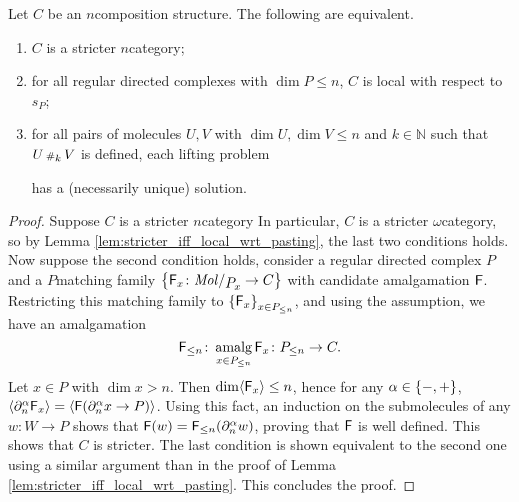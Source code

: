 \begin{lem} \label{lem:stricter_n_iff_local_with_dim_le_n}
    Let \( C \) be an \( n \)\nbd composition structure.
    The following are equivalent.
    \begin{enumerate}
        \item \( C \) is a stricter \( n \)\nbd category;
        \item for all regular directed complexes with \( \dim P \le n \), \( C \) is local with respect to \( s_P \);
        \item for all pairs of molecules \( U, V \) with \( \dim U, \dim V \le n \) and \( k \in \mathbb{N} \) such that \( U \cp{k} V \) is defined, each lifting problem
            \begin{center}
            \end{center}
            has a (necessarily unique) solution.
    \end{enumerate}
\end{lem}
\begin{proof}
    Suppose \( C \) is a stricter \( n \)\nbd category 
    In particular, \( C \) is a stricter \( \omega \)\nbd category, so by Lemma \ref{lem:stricter_iff_local_wrt_pasting}, the last two conditions holds.
    Now suppose the second condition holds, consider a regular directed complex \( P \) and a \( P \)\nbd matching family \( \set{\F_x \colon \molecin{\imel{P}{x}} \to C} \) with candidate amalgamation \( \F \).
    Restricting this matching family to \( \set{\F_x}_{x \in \gr{\le n}{P}} \), and using the assumption, we have an amalgamation 
    \begin{equation*}
        \gr{\le n}{\F} \colon \amalg_{x \in \gr{\le n}{P}} \F_x \colon \gr{\le n}{P} \to C.
    \end{equation*}
    Let \( x \in P \) with \( \dim x > n \).
    Then \( \dim \pcell{\F_x} \le n \), hence for any \( \a \in \set{-, +} \), \( \pcell{\bd{n}{\a} \F_x} = \pcell{\F(\bd{n}{\a} x \to P)} \).
    Using this fact, an induction on the submolecules of any \( w \colon W \to P \) shows that \( \F(w) = \gr{\le n}{\F}(\bd{n}{\a} w) \), proving that \( \F \) is well defined.
    This shows that \( C \) is stricter.
    The last condition is shown equivalent to the second one using a similar argument than in the proof of Lemma \ref{lem:stricter_iff_local_wrt_pasting}.
    This concludes the proof.
\end{proof}

